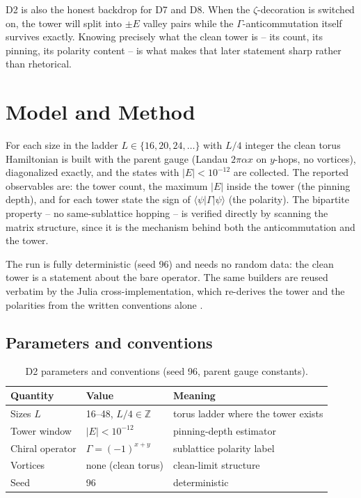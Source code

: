 \documentclass[11pt,a4paper]{article}
\begin{document}
D2 is also the honest backdrop for D7 and D8. When the $\zeta$-decoration is switched on, the tower will split into $\pm E$ valley pairs while the $\Gamma$-anticommutation itself survives exactly. Knowing precisely what the clean tower is -- its count, its pinning, its polarity content -- is what makes that later statement sharp rather than rhetorical.

\section{Model and Method}
For each size in the ladder $L \in \{16, 20, 24, \dots\}$ with $L/4$ integer the clean torus Hamiltonian is built with the parent gauge (Landau $2\pi\alpha x$ on $y$-hops, no vortices), diagonalized exactly, and the states with $|E| < 10^{-12}$ are collected. The reported observables are: the tower count, the maximum $|E|$ inside the tower (the pinning depth), and for each tower state the sign of $\langle\psi|\Gamma|\psi\rangle$ (the polarity). The bipartite property -- no same-sublattice hopping -- is verified directly by scanning the matrix structure, since it is the mechanism behind both the anticommutation and the tower.

The run is fully deterministic (seed 96) and needs no random data: the clean tower is a statement about the bare operator. The same builders are reused verbatim by the Julia cross-implementation, which re-derives the tower and the polarities from the written conventions alone \cite{parent}.

\subsection{Parameters and conventions}
\begin{table}[htbp]\centering\small
\begin{tabularx}{\columnwidth}{@{}l l X@{}}
\toprule
Quantity & Value & Meaning \\
\midrule
Sizes $L$ & 16--48, $L/4 \in \mathbb{Z}$ & torus ladder where the tower exists \\
Tower window & $|E| < 10^{-12}$ & pinning-depth estimator \\
Chiral operator & $\Gamma = (-1)^{x+y}$ & sublattice polarity label \\
Vortices & none (clean torus) & clean-limit structure \\
Seed & 96 & deterministic \\
\bottomrule
\end{tabularx}
\caption{D2 parameters and conventions (seed 96, parent gauge constants).}
\end{table}
\end{document}
